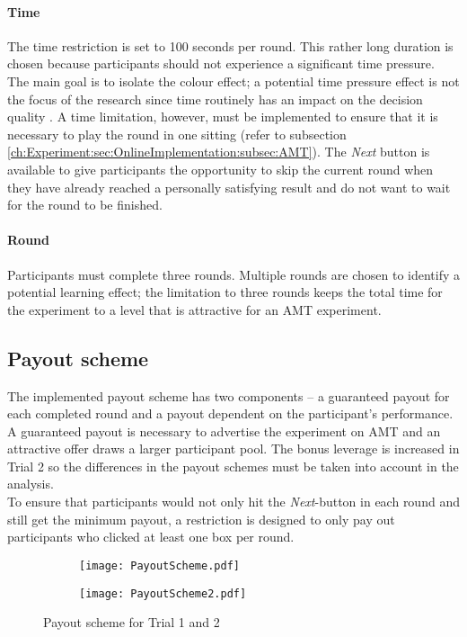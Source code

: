 \paragraph{Time}
The time restriction is set to 100 seconds per round. This rather long duration is chosen because participants should not experience a significant time pressure. The main goal is to isolate the colour effect; a potential time pressure effect is not the focus of the research since time routinely has an impact on the decision quality \citep{Hahn2006}. A time limitation, however, must be implemented to ensure that it is necessary to play the round in one sitting (refer to subsection  \ref{ch:Experiment:sec:OnlineImplementation:subsec:AMT}).
The \textit{Next} button is available to give participants the opportunity to skip the current round when they have already reached a personally satisfying result and do not want to wait for the round to be finished.
\paragraph{Round}
Participants must complete three rounds. Multiple rounds are chosen to identify a potential learning effect; the limitation to three rounds keeps the total time for the experiment to a level that is attractive for an \ac{AMT} experiment. 


\subsection{Payout scheme}
\label{ch:Experiment:sec:Interface:subsec:Payout scheme}
The implemented payout scheme has two components – a guaranteed payout for each completed round and a payout dependent on the participant’s performance. A guaranteed payout is necessary to advertise the experiment on \ac{AMT} and an attractive offer draws a larger participant pool. The bonus leverage is increased in Trial 2 so the differences in the payout schemes must be taken into account in the analysis.\\
To ensure that participants would not only hit the \textit{Next}-button in each round and still get the minimum payout, a restriction is designed to only pay out participants who clicked at least one box per round.
 \begin{figure}[htp] %
\begin{center}
\begin{subfigure} 
\centering
\texttt{[image: PayoutScheme.pdf]}
\end{subfigure}
\begin{subfigure} 
\centering
\texttt{[image: PayoutScheme2.pdf]}
\end{subfigure}
\caption{Payout scheme for Trial 1 and 2}
\label{fig:PayoutScheme}
\end{center}
\end{figure} 

